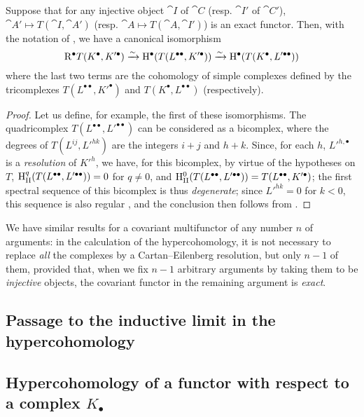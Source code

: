 \begin{proposition}[11.4.7]
\label{0.11.4.7}
Suppose that for any injective object $\cat{I}$ of $\cat{C}$ (resp. $\cat{I'}$ of $\cat{C}'$), $\cat{A'}\mapsto T(\cat{I}, \cat{A'})$ (resp. $\cat{A}\mapsto T(\cat{A}, \cat{I'})$) is an exact functor.
Then, with the notation of , we have a canonical isomorphism
\[
  \mathrm{R}^\bullet T(K^\bullet, K'^\bullet) \xrightarrow{\sim} \mathrm{H}^\bullet(T(L^{\bullet\bullet}, K'^\bullet)) \xrightarrow{\sim} \mathrm{H}^\bullet(T(K^\bullet, L'^{\bullet\bullet})) 
\]
where the last two terms are the cohomology of simple complexes defined by the tricomplexes $T(L^{\bullet\bullet}, K'^\bullet)$ and $T(K^\bullet, L^{\bullet\bullet})$ (respectively).
\end{proposition}

\begin{proof}
Let us define, for example, the first of these isomorphisms.
The quadricomplex $T(L^{\bullet\bullet}, L'^{\bullet\bullet})$ can be considered as a bicomplex, where the degrees of $T(L^{ij}, L'^{hk})$ are the integers $i+j$ and $h+k$.
Since, for each $h$, ${L'}^{h,\bullet}$ is a \emph{resolution} of ${K'}^h$, we have, for this bicomplex, by virtue of the hypotheses on $T$, $\mathrm{H}_\mathrm{II}^q(T(L^{\bullet\bullet}, L'^{\bullet\bullet}))=0$ for $q\neq 0$, and $\mathrm{H}_\mathrm{II}^0(T(L^{\bullet\bullet}, L'^{\bullet\bullet})) = T(L^{\bullet\bullet}, K'^\bullet)$;
the first spectral sequence of this bicomplex is thus \emph{degenerate};
since $L'^{hk}=0$ for $k<0$, this sequence is also regular , and the conclusion then follows from .
\end{proof}

We have similar results for a covariant multifunctor of any number $n$ of arguments: in the calculation of the hypercohomology, it is not necessary to replace \emph{all} the complexes 
by a Cartan--Eilenberg resolution, but only $n-1$ of them, provided that, when we fix $n-1$ arbitrary arguments by taking them to be \emph{injective} objects, the covariant functor in the remaining argument is \emph{exact}.


\subsection{Passage to the inductive limit in the hypercohomology}
\label{subsection:0.11.5}

\subsection{Hypercohomology of a functor with respect to a complex $K_{\bullet}$}
\label{subsection:0.11.6}

